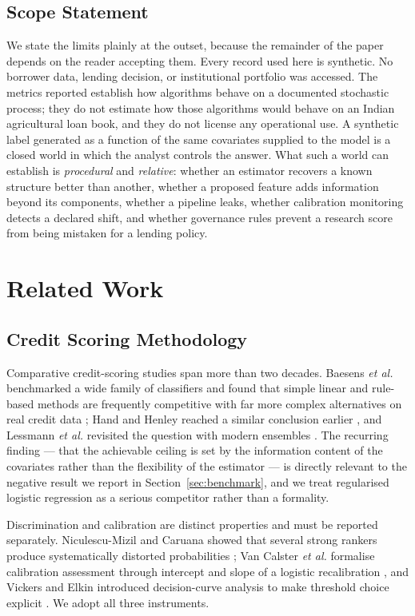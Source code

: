 \documentclass[journal]{IEEEtran}
\begin{document}
\subsection{Scope Statement}
We state the limits plainly at the outset, because the remainder of the paper depends on the reader accepting them. Every record used here is synthetic. No borrower data, lending decision, or institutional portfolio was accessed. The metrics reported establish how algorithms behave on a documented stochastic process; they do not estimate how those algorithms would behave on an Indian agricultural loan book, and they do not license any operational use. A synthetic label generated as a function of the same covariates supplied to the model is a closed world in which the analyst controls the answer. What such a world can establish is \emph{procedural} and \emph{relative}: whether an estimator recovers a known structure better than another, whether a proposed feature adds information beyond its components, whether a pipeline leaks, whether calibration monitoring detects a declared shift, and whether governance rules prevent a research score from being mistaken for a lending policy.

\section{Related Work}
\label{sec:related}

\subsection{Credit Scoring Methodology}
Comparative credit-scoring studies span more than two decades. Baesens \textit{et al.} benchmarked a wide family of classifiers and found that simple linear and rule-based methods are frequently competitive with far more complex alternatives on real credit data \cite{baesens2003benchmarking}; Hand and Henley reached a similar conclusion earlier \cite{hand1997credit}, and Lessmann \textit{et al.} revisited the question with modern ensembles \cite{lessmann2015benchmarking}. The recurring finding --- that the achievable ceiling is set by the information content of the covariates rather than the flexibility of the estimator --- is directly relevant to the negative result we report in Section~\ref{sec:benchmark}, and we treat regularised logistic regression as a serious competitor rather than a formality.

Discrimination and calibration are distinct properties and must be reported separately. Niculescu-Mizil and Caruana showed that several strong rankers produce systematically distorted probabilities \cite{niculescu2005calibration}; Van Calster \textit{et al.} formalise calibration assessment through intercept and slope of a logistic recalibration \cite{vancalster2019calibration}, and Vickers and Elkin introduced decision-curve analysis to make threshold choice explicit \cite{vickers2006decision}. We adopt all three instruments.
\end{document}
